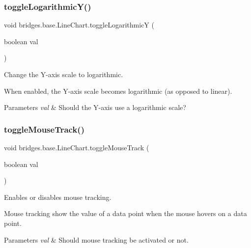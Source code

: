 \subsubsection{\texorpdfstring{toggle\+Logarithmic\+Y()}{toggleLogarithmicY()}}
{\footnotesize\ttfamily void bridges.\+base.\+Line\+Chart.\+toggle\+LogarithmicY (\begin{DoxyParamCaption}\item[{boolean}]{val }\end{DoxyParamCaption})}



Change the Y-\/axis scale to logarithmic. 

When enabled, the Y-\/axis scale becomes logarithmic (as opposed to linear).


\begin{DoxyParams}{Parameters}
{\em val} & Should the Y-\/axis use a logarithmic scale? \\
\hline
\end{DoxyParams}
\mbox{\label{classbridges_1_1base_1_1_line_chart_a095d16c1544cf373b8d2bf68ca864bd9}} 
\subsubsection{\texorpdfstring{toggle\+Mouse\+Track()}{toggleMouseTrack()}}
{\footnotesize\ttfamily void bridges.\+base.\+Line\+Chart.\+toggle\+Mouse\+Track (\begin{DoxyParamCaption}\item[{boolean}]{val }\end{DoxyParamCaption})}



Enables or disables mouse tracking. 

Mouse tracking show the value of a data point when the mouse hovers on a data point.


\begin{DoxyParams}{Parameters}
{\em val} & Should mouse tracking be activated or not. \\
\hline
\end{DoxyParams}
\mbox{\label{classbridges_1_1base_1_1_line_chart_adae74cfb09585727a96cf74ddf74d098}} 
